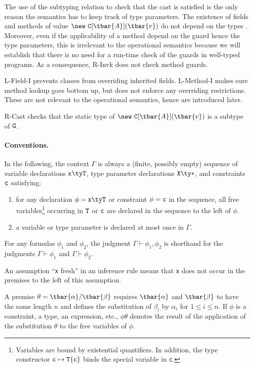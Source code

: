 The use of the subtyping relation to check that the cast is satisfied is the only reason the semantics has to keep track of type parameters. The existence of fields and methods of value $\new~{\tt C}[\tbar{A}](\tbar{v})$ do not depend on the types . Moreover, even if the applicability of a method depend on the guard hence the type parameters, this is irrelevant to the operational semantics because we will establish that there is no need for a run-time check of the guards in well-typed programs. As a consequence, {\sc R-Invk} does not check method guards. 


{\sc L-Field-I} prevents classes from overriding inherited fields. {\sc L-Method-I} makes sure method lookup goes bottom up, but does not enforce any overriding restrictions. These are not relevant to the operational semantics, hence are introduced later.


{\sc R-Cast} checks that the static type of $\new~{\tt C}[\tbar{A}](\tbar{v})$ is a subtype of $\tt G$.


\paragraph{Conventions.}
In the following, the context $\Gamma$ is always a (finite, possibly empty) sequence of variable declarations $\tt x\ty T$, type parameter declarations $\tt X\ty*$, and constraints $\tt c$ satisfying:
\begin{enumerate}
  \item for any declaration $\phi=\tt x\ty T$ or constraint $\phi=\tt c$ in the sequence, all free variables\footnote{Variables are bound by existential quantifiers. In addition, the type constructor ${\tt c}\mapsto{\tt T}\{{\tt c}\}$ binds the special variable {\self} in {\tt c}.} occurring in $\tt T$ or $\tt c$ are declared in the sequence to the left of $\phi$.

  \item a variable or type parameter is declared at most once in $\Gamma$.
\end{enumerate}
For any formulas $\phi_1$ and $\phi_2$, the judgment $\Gamma \vdash \phi_1\comma\phi_2$ is shorthand for the judgments $\Gamma \vdash \phi_1$ and $\Gamma \vdash \phi_2$. 

An assumption ``{\tt x} fresh'' in an inference rule means that {\tt x} does not occur in the premises to the left of this assumption.

A premise $\theta=\tbar{\alpha}/\tbar{\beta}$ requires $\tbar{\alpha}$ and $\tbar{\beta}$ to have the same length $n$ and defines the substitution of $\beta_i$ by $\alpha_i$ for $1\leq i\leq n$. If $\phi$ is a constraint, a type, an expression, etc., $\phi\theta$ denotes the result of the application of the substitution $\theta$ to the free variables of $\phi$.

